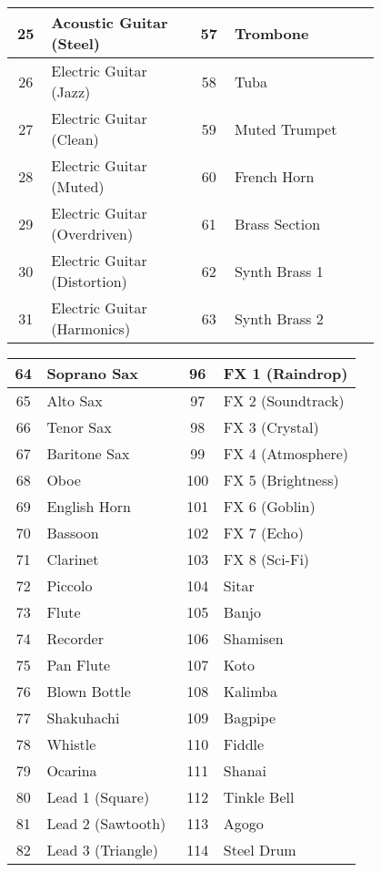 \begin{tabular}{|c|p{0.4\linewidth}|c|p{0.4\linewidth}|}
	25  &  Acoustic Guitar (Steel)  & 57  &  Trombone  \\ \hline
	26  &  Electric Guitar (Jazz)  & 58  &  Tuba  \\ \hline
	27  &  Electric Guitar (Clean)  & 59  &  Muted Trumpet  \\ \hline
	28  &  Electric Guitar (Muted)  & 60  &  French Horn  \\ \hline
	29  &  Electric Guitar (Overdriven)  & 61  &  Brass Section  \\ \hline
	30  &  Electric Guitar (Distortion)  & 62  &  Synth Brass 1  \\ \hline
	31  &  Electric Guitar (Harmonics)  & 63  &  Synth Brass 2  \\ \hline
\end{tabular}

\begin{tabular}{|c|p{0.4\linewidth}|c|p{0.4\linewidth}|}
	\hline
	64  &  Soprano Sax & 96  &  FX 1 (Raindrop) \\ \hline
	65  &  Alto Sax & 97  &  FX 2 (Soundtrack) \\ \hline
	66  &  Tenor Sax & 98 & FX 3 (Crystal) \\ \hline
	67  &  Baritone Sax & 99  &  FX 4 (Atmosphere) \\ \hline
	68  &  Oboe & 100  &  FX 5 (Brightness) \\ \hline
	69  &  English Horn & 101  &  FX 6 (Goblin) \\ \hline
	70  &  Bassoon & 102  &  FX 7 (Echo) \\ \hline
	71  &  Clarinet & 103  &  FX 8 (Sci-Fi) \\ \hline
	72  &  Piccolo & 104  &  Sitar \\ \hline
	73  &  Flute & 105  &  Banjo \\ \hline
	74  &  Recorder & 106  &  Shamisen \\ \hline
	75  &  Pan Flute & 107  &  Koto \\ \hline
	76  &  Blown Bottle & 108  &  Kalimba \\ \hline
	77  &  Shakuhachi & 109  &  Bagpipe \\ \hline
	78  &  Whistle & 110  &  Fiddle \\ \hline
	79  &  Ocarina & 111  &  Shanai \\ \hline
	80  &  Lead 1 (Square) & 112  &  Tinkle Bell \\ \hline
	81  &  Lead 2 (Sawtooth) & 113  &  Agogo \\ \hline
	82  &  Lead 3 (Triangle) & 114  &  Steel Drum \\ \hline

\end{tabular}
